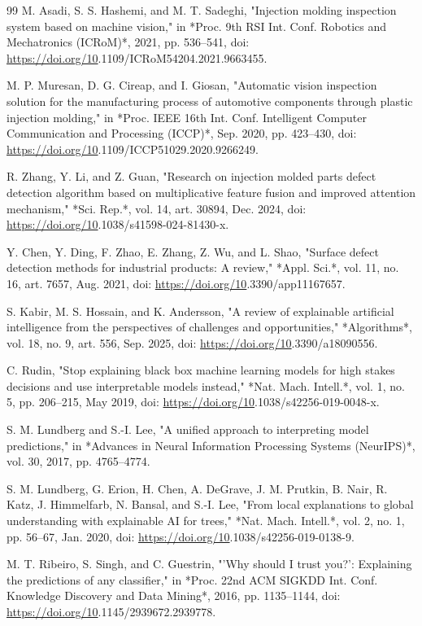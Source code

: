 \begin{thebibliography}{99}
 M. Asadi, S. S. Hashemi, and M. T. Sadeghi, "Injection molding inspection system based on machine vision," in *Proc. 9th RSI Int. Conf. Robotics and Mechatronics (ICRoM)*, 2021, pp. 536–541, doi: \url{https://doi.org/10}.1109/ICRoM54204.2021.9663455.

 M. P. Muresan, D. G. Cireap, and I. Giosan, "Automatic vision inspection solution for the manufacturing process of automotive components through plastic injection molding," in *Proc. IEEE 16th Int. Conf. Intelligent Computer Communication and Processing (ICCP)*, Sep. 2020, pp. 423–430, doi: \url{https://doi.org/10}.1109/ICCP51029.2020.9266249.

 R. Zhang, Y. Li, and Z. Guan, "Research on injection molded parts defect detection algorithm based on multiplicative feature fusion and improved attention mechanism," *Sci. Rep.*, vol. 14, art. 30894, Dec. 2024, doi: \url{https://doi.org/10}.1038/s41598-024-81430-x.

 Y. Chen, Y. Ding, F. Zhao, E. Zhang, Z. Wu, and L. Shao, "Surface defect detection methods for industrial products: A review," *Appl. Sci.*, vol. 11, no. 16, art. 7657, Aug. 2021, doi: \url{https://doi.org/10}.3390/app11167657.

 S. Kabir, M. S. Hossain, and K. Andersson, "A review of explainable artificial intelligence from the perspectives of challenges and opportunities," *Algorithms*, vol. 18, no. 9, art. 556, Sep. 2025, doi: \url{https://doi.org/10}.3390/a18090556.

 C. Rudin, "Stop explaining black box machine learning models for high stakes decisions and use interpretable models instead," *Nat. Mach. Intell.*, vol. 1, no. 5, pp. 206–215, May 2019, doi: \url{https://doi.org/10}.1038/s42256-019-0048-x.

 S. M. Lundberg and S.-I. Lee, "A unified approach to interpreting model predictions," in *Advances in Neural Information Processing Systems (NeurIPS)*, vol. 30, 2017, pp. 4765–4774.

 S. M. Lundberg, G. Erion, H. Chen, A. DeGrave, J. M. Prutkin, B. Nair, R. Katz, J. Himmelfarb, N. Bansal, and S.-I. Lee, "From local explanations to global understanding with explainable AI for trees," *Nat. Mach. Intell.*, vol. 2, no. 1, pp. 56–67, Jan. 2020, doi: \url{https://doi.org/10}.1038/s42256-019-0138-9.

 M. T. Ribeiro, S. Singh, and C. Guestrin, "'Why should I trust you?': Explaining the predictions of any classifier," in *Proc. 22nd ACM SIGKDD Int. Conf. Knowledge Discovery and Data Mining*, 2016, pp. 1135–1144, doi: \url{https://doi.org/10}.1145/2939672.2939778.


\end{thebibliography}
